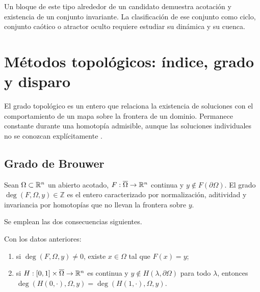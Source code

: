 Un bloque de este tipo alrededor de un candidato demuestra acotación y
existencia de un conjunto invariante. La clasificación de ese conjunto como
ciclo, conjunto caótico o atractor oculto requiere estudiar su dinámica y su
cuenca.

\fi
\HAFOGeoRenderBlocktrue
\ifdefined\HAFOGeoBlockSelect
  \HAFOGeoRenderBlockfalse
  \ifdefined\HAFOGeoBlockDegree\HAFOGeoRenderBlocktrue\fi
\fi
\ifHAFOGeoRenderBlock
\HAFOStudyNeedspace
\section{Métodos topológicos: índice, grado y disparo}
\label{sec:geo-degree}

\HAFOCardDegree

El grado topológico es un entero que relaciona la existencia de soluciones
con el comportamiento de un mapa sobre la frontera de un dominio. Permanece
constante durante una homotopía admisible, aunque las soluciones individuales
no se conozcan explícitamente \cite{Amster2021MetodosTopologicos}.

\subsection{Grado de Brouwer}

\begin{definition}
Sean \(\Omega\subset\mathbb{R}^n\) un abierto acotado,
\(F:\overline\Omega\to\mathbb{R}^n\) continua y
\(y\notin F(\partial\Omega)\). El grado
\(\deg(F,\Omega,y)\in\mathbb Z\) es el entero caracterizado por normalización,
aditividad y invariancia por homotopías que no llevan la frontera sobre \(y\).
\end{definition}

Se emplean las dos consecuencias siguientes.

\begin{proposition}
Con los datos anteriores:
\begin{enumerate}
  \item si \(\deg(F,\Omega,y)\ne0\), existe \(x\in\Omega\) tal que
        \(F(x)=y\);
  \item si \(H:[0,1]\times\overline\Omega\to\mathbb{R}^n\) es continua y
        \(y\notin H(\lambda,\partial\Omega)\) para todo \(\lambda\), entonces
        \(\deg(H(0,\cdot),\Omega,y)=
        \deg(H(1,\cdot),\Omega,y)\).
\end{enumerate}
\end{proposition}

